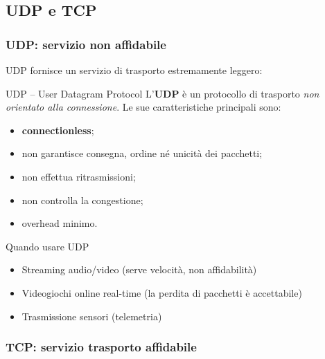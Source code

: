 \documentclass[a4paper,12pt]{report}
\begin{document}
\subsection{UDP e TCP}







\subsubsection*{UDP: servizio non affidabile}

UDP fornisce un servizio di trasporto estremamente leggero:

\begin{defbox}{UDP -- User Datagram Protocol}
L’\textbf{UDP} è un protocollo di trasporto \textit{non orientato alla connessione}.  
Le sue caratteristiche principali sono:
\begin{itemize}
    \item \textbf{connectionless};
    \item non garantisce consegna, ordine né unicità dei pacchetti;
    \item non effettua ritrasmissioni;
    \item non controlla la congestione;
    \item overhead minimo.
\end{itemize}
\end{defbox}


\begin{esempiobox}{Quando usare UDP}
\begin{itemize}
    \item Streaming audio/video (serve velocità, non affidabilità)
    \item Videogiochi online real-time (la perdita di pacchetti è accettabile)
    \item Trasmissione sensori (telemetria)
\end{itemize}
\end{esempiobox}

\subsubsection*{TCP: servizio trasporto affidabile}
\end{document}
